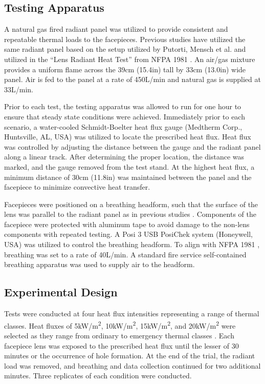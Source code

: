 \documentclass[sn-mathphys]{sn-jnl}%
\theoremstyle{thmstyleone}%
\theoremstyle{thmstyletwo}%
\theoremstyle{thmstylethree}%
\begin{document}
\subsection{Testing Apparatus}\label{subsec3}

A natural gas fired radiant panel was utilized to provide consistent and repeatable thermal loads to the facepieces. Previous studies have utilized the same radiant panel \cite{horn_study_2017,kesler_mechanical_2018} based on the setup utilized by Putorti, Mensch et al.\cite{putorti_thermal_2013} and utilized in the “Lens Radiant Heat Test” from NFPA 1981 \cite{national_fire_protection_association_nfpa_2013}. An air/gas mixture provides a uniform flame across the 39cm (15.4in) tall by 33cm (13.0in) wide panel. Air is fed to the panel at a rate of 450L/min and natural gas is supplied at 33L/min. 

Prior to each test, the testing apparatus was allowed to run for one hour to ensure that steady state conditions were achieved. Immediately prior to each scenario, a water-cooled Schmidt-Boelter heat flux gauge (Medtherm Corp., Huntsville, AL, USA) was utilized to locate the prescribed heat flux. Heat flux was controlled by adjusting the distance between the gauge and the radiant panel along a linear track. After determining the proper location, the distance was marked, and the gauge removed from the test stand. At the highest heat flux, a minimum distance of 30cm (11.8in) was maintained between the panel and the facepiece to minimize convective heat transfer. 

Facepieces were positioned on a breathing headform, such that the surface of the lens was parallel to the radiant panel as in previous studies \cite{putorti_thermal_2013,horn_study_2017,kesler_mechanical_2018}. Components of the facepiece were protected with aluminum tape to avoid damage to the non-lens components with repeated testing. A Posi 3 USB PosiChek system (Honeywell, USA) was utilized to control the breathing headform. To align with NFPA 1981 \cite{national_fire_protection_association_nfpa_2013}, breathing was set to a rate of 40L/min. A standard fire service self-contained breathing apparatus was used to supply air to the headform. 

\subsection{Experimental Design}\label{subsec4}
Tests were conducted at four heat flux intensities representing a range of thermal classes. Heat fluxes of 5kW/m\textsuperscript{2}, 10kW/m\textsuperscript{2}, 15kW/m\textsuperscript{2}, and 20kW/m\textsuperscript{2} were selected as they range from ordinary to emergency thermal classes \cite{utech_status_1973}. Each facepiece lens was exposed to the prescribed heat flux until the lesser of 30 minutes or the occurrence of hole formation. At the end of the trial, the radiant load was removed, and breathing and data collection continued for two additional minutes. Three replicates of each condition were conducted. 
\end{document}
